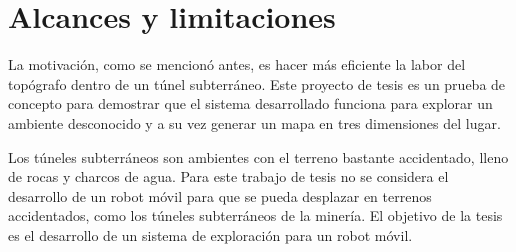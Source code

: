 


\section{Alcances y limitaciones}

La motivación, como se mencionó antes, es hacer más eficiente la labor del topógrafo 
dentro de un túnel subterráneo. Este proyecto de tesis es un prueba de concepto para 
demostrar que el sistema desarrollado funciona para explorar un ambiente desconocido y 
a su vez generar un mapa en tres dimensiones del lugar.

Los túneles subterráneos son ambientes con el terreno bastante accidentado, lleno de
rocas y charcos de agua. Para este trabajo de tesis no se considera el desarrollo de 
un robot móvil para que se pueda desplazar en terrenos accidentados, como los túneles 
subterráneos de la minería. El objetivo de la tesis es el desarrollo de un sistema 
de exploración para un robot móvil. 

